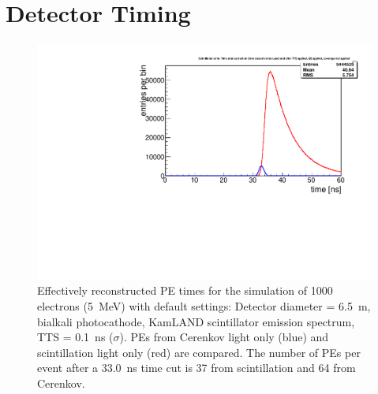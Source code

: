 \documentclass[aps,prc,twocolumn,groupedaddress,showpacs,amsmath,amssymb,floatfix,superscriptaddress]{revtex4}
\begin{document}
\section{Detector Timing}
\label{detector_timing_sec}
\begin{figure}
        \begin{center}
        \includegraphics[scale=0.40]{graphs/6p5Meter_5MeVElectrons_Bialkali_KamlandScintSpec_TIME.pdf}
        \caption[]{Effectively reconstructed PE times for the simulation of 1000 electrons (5~MeV) with default settings: Detector diameter = 6.5~m, bialkali photocathode, KamLAND scintillator emission spectrum, TTS = 0.1~ns ($\sigma$). PEs from Cerenkov light only (blue) and scintillation light only (red) are compared. The number of PEs per event after a 33.0~ns time cut is 37 from scintillation and 64 from Cerenkov. \label{6p5Meter_5MeVElectrons_Bialkali_KamlandScintSpec_TIME}}
        \end{center}
\end{figure}
\end{document}
